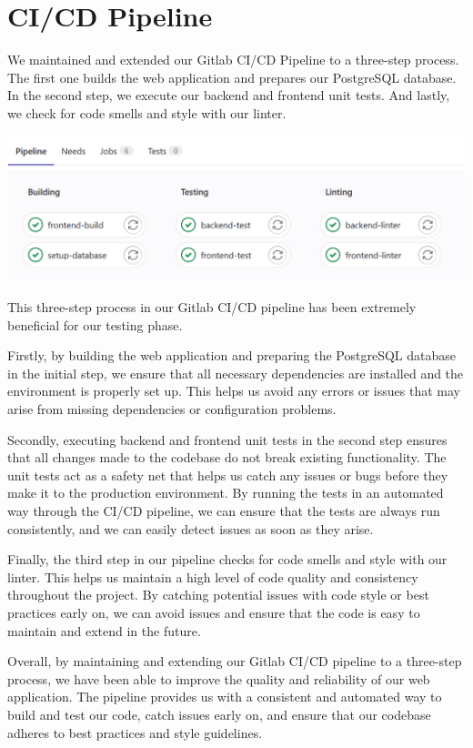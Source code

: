 \section{CI/CD Pipeline}
We maintained and extended our Gitlab CI/CD Pipeline to a three-step process. The first one builds the web application and prepares our PostgreSQL database. In the second step, we execute our backend and frontend unit tests. And lastly, we check for code smells and style with our linter.

\includegraphics[width=1\textwidth]{images/pipeline.png}


This three-step process in our Gitlab CI/CD pipeline has been extremely beneficial for our testing phase.

Firstly, by building the web application and preparing the PostgreSQL database in the initial step, we ensure that all necessary dependencies are installed and the environment is properly set up. This helps us avoid any errors or issues that may arise from missing dependencies or configuration problems.

Secondly, executing backend and frontend unit tests in the second step ensures that all changes made to the codebase do not break existing functionality. The unit tests act as a safety net that helps us catch any issues or bugs before they make it to the production environment. By running the tests in an automated way through the CI/CD pipeline, we can ensure that the tests are always run consistently, and we can easily detect issues as soon as they arise.

Finally, the third step in our pipeline checks for code smells and style with our linter. This helps us maintain a high level of code quality and consistency throughout the project. By catching potential issues with code style or best practices early on, we can avoid issues and ensure that the code is easy to maintain and extend in the future.

Overall, by maintaining and extending our Gitlab CI/CD pipeline to a three-step process, we have been able to improve the quality and reliability of our web application. The pipeline provides us with a consistent and automated way to build and test our code, catch issues early on, and ensure that our codebase adheres to best practices and style guidelines.
